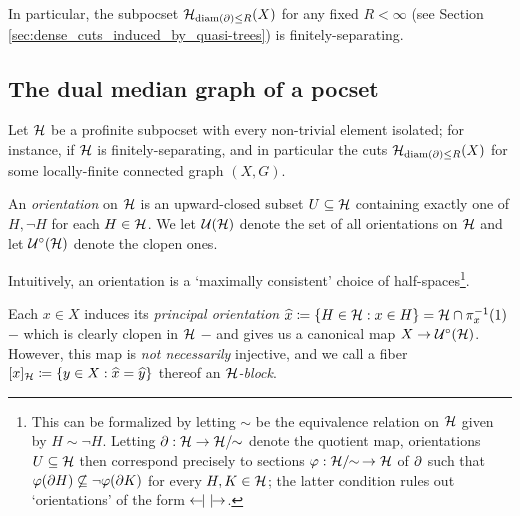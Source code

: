 \documentclass{amsart}
\begin{document}
    In particular, the subpocset $\mathcal{H}_{\operatorname{diam}(\partial)\leq R}(X)$ for any fixed $R<\infty$ (see Section \ref{sec:dense_cuts_induced_by_quasi-trees}) is finitely-separating.

    \subsection{The dual median graph of a pocset}\label{sec:the_dual_median_graph_of_a_pocset}

    Let $\mathcal{H}$ be a profinite subpocset with every non-trivial element isolated; for instance, if $\mathcal{H}$ is finitely-separating, and in particular the cuts $\mathcal{H}_{\operatorname{diam}(\partial)\leq R}(X)$ for some locally-finite connected graph $(X,G)$.
    
    \begin{definition}\label{def:orientation}
        An \textit{orientation} on $\mathcal{H}$ is an upward-closed subset $U\subseteq\mathcal{H}$ containing exactly one of $H,\lnot H$ for each $H\in\mathcal{H}$. We let $\mathcal{U}(\mathcal{H})$ denote the set of all orientations on $\mathcal{H}$ and let $\mathcal{U}^\circ(\mathcal{H})$ denote the clopen ones.
    \end{definition}

    Intuitively, an orientation is a `maximally consistent' choice of half-spaces\footnote{This can be formalized by letting $\sim$ be the equivalence relation on $\mathcal{H}$ given by $H\sim\lnot H$. Letting $\partial:\mathcal{H}\to\mathcal{H}/\!\!\sim$ denote the quotient map, orientations $U\subseteq\mathcal{H}$ then correspond precisely to sections $\varphi:\mathcal{H}/\!\!\sim\,\to\mathcal{H}$ of $\partial$ such that $\varphi(\partial H)\not\subseteq\lnot\varphi(\partial K)$ for every $H,K\in\mathcal{H}$; the latter condition rules out `orientations' of the form $\leftarrow\hspace{-4.15pt}|\,\,|\hspace{-4.15pt}\rightarrow$.}.

    \begin{example}
        Each $x\in X$ induces its \textit{principal orientation} $\widehat{x}\coloneqq\left\{H\in\mathcal{H}: x\in H\right\}=\mathcal{H}\cap\pi^{-1}_x(1)$ $-$ which is clearly clopen in $\mathcal{H}$ $-$ and gives us a canonical map $X\to\mathcal{U}^\circ(\mathcal{H})$. However, this map is \textit{not necessarily} injective, and we call a fiber $[x]_{\mathcal{H}}\coloneqq\left\{y\in X:\widehat{x}=\widehat{y}\right\}$ thereof an \textit{$\mathcal{H}$-block}.
    \end{example}

    {}
\end{document}
